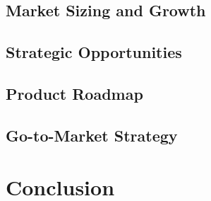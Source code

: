 \documentclass[11pt,letterpaper]{article}
\begin{document}
\subsection{Market Sizing and Growth}

\subsection{Strategic Opportunities}

\subsection{Product Roadmap}

\subsection{Go-to-Market Strategy}

\section{Conclusion}



\end{document}
